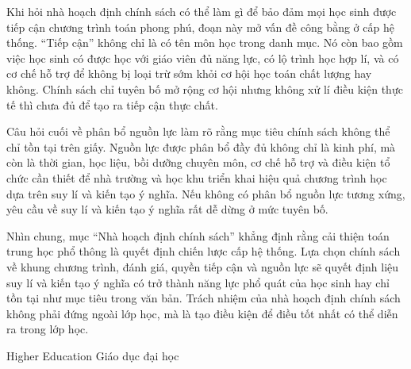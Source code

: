 {{    Khi hỏi nhà hoạch định chính sách có thể làm gì để bảo đảm mọi học sinh được tiếp cận chương trình toán phong phú, đoạn này mở vấn đề công bằng ở cấp hệ thống. ``Tiếp cận'' không chỉ là có tên môn học trong danh mục. Nó còn bao gồm việc học sinh có được học với giáo viên đủ năng lực, có lộ trình học hợp lí, và có cơ chế hỗ trợ để không bị loại trừ sớm khỏi cơ hội học toán chất lượng hay không. Chính sách chỉ tuyên bố mở rộng cơ hội nhưng không xử lí điều kiện thực tế thì chưa đủ để tạo ra tiếp cận thực chất.

    Câu hỏi cuối về phân bổ nguồn lực làm rõ rằng mục tiêu chính sách không thể chỉ tồn tại trên giấy. Nguồn lực được phân bổ đầy đủ không chỉ là kinh phí, mà còn là thời gian, học liệu, bồi dưỡng chuyên môn, cơ chế hỗ trợ và điều kiện tổ chức cần thiết để nhà trường và học khu triển khai hiệu quả chương trình học dựa trên suy lí và kiến tạo ý nghĩa. Nếu không có phân bổ nguồn lực tương xứng, yêu cầu về suy lí và kiến tạo ý nghĩa rất dễ dừng ở mức tuyên bố.

    Nhìn chung, mục ``Nhà hoạch định chính sách'' khẳng định rằng cải thiện toán trung học phổ thông là quyết định chiến lược cấp hệ thống. Lựa chọn chính sách về khung chương trình, đánh giá, quyền tiếp cận và nguồn lực sẽ quyết định liệu suy lí và kiến tạo ý nghĩa có trở thành năng lực phổ quát của học sinh hay chỉ tồn tại như mục tiêu trong văn bản. Trách nhiệm của nhà hoạch định chính sách không phải đứng ngoài lớp học, mà là tạo điều kiện để điều tốt nhất có thể diễn ra trong lớp học.}
  }

\ParallelSection
  {Higher Education}
  {Giáo dục đại học}
  {}

